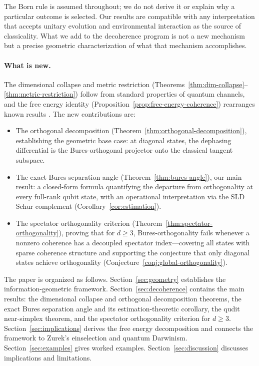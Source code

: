 \documentclass[12pt,a4paper]{article}
\theoremstyle{definition}
\theoremstyle{remark}
\begin{document}
The Born rule is assumed throughout; we do not derive it or explain why a particular outcome is selected.  Our results are compatible with any interpretation that accepts unitary evolution and environmental interaction as the source of classicality.  What we add to the decoherence program is not a new mechanism but a precise geometric characterization of what that mechanism accomplishes.

\paragraph{What is new.}  The dimensional collapse and metric restriction (Theorems~\ref{thm:dim-collapse}--\ref{thm:metric-restriction}) follow from standard properties of quantum channels, and the free energy identity (Proposition~\ref{prop:free-energy-coherence}) rearranges known results \cite{lostaglio2015description,korzekwa2016extraction,streltsov2017colloquium}.  The new contributions are:
\begin{itemize}
\item The orthogonal decomposition (Theorem~\ref{thm:orthogonal-decomposition}), establishing the geometric base case: at diagonal states, the dephasing differential is the Bures-orthogonal projector onto the classical tangent subspace.
\item The exact Bures separation angle (Theorem~\ref{thm:bures-angle}), our main result: a closed-form formula quantifying the departure from orthogonality at every full-rank qubit state, with an operational interpretation via the SLD Schur complement (Corollary~\ref{cor:estimation}).
\item The spectator orthogonality criterion (Theorem~\ref{thm:spectator-orthogonality}), proving that for $d \geq 3$, Bures-orthogonality fails whenever a nonzero coherence has a decoupled spectator index---covering all states with sparse coherence structure and supporting the conjecture that only diagonal states achieve orthogonality (Conjecture~\ref{conj:global-orthogonality}).
\end{itemize}

The paper is organized as follows. Section~\ref{sec:geometry} establishes the information-geometric framework. Section~\ref{sec:decoherence} contains the main results: the dimensional collapse and orthogonal decomposition theorems, the exact Bures separation angle and its estimation-theoretic corollary, the qudit near-simplex theorem, and the spectator orthogonality criterion for $d \geq 3$.  Section~\ref{sec:implications} derives the free energy decomposition and connects the framework to Zurek's einselection and quantum Darwinism.  Section~\ref{sec:examples} gives worked examples.  Section~\ref{sec:discussion} discusses implications and limitations.
\end{document}
